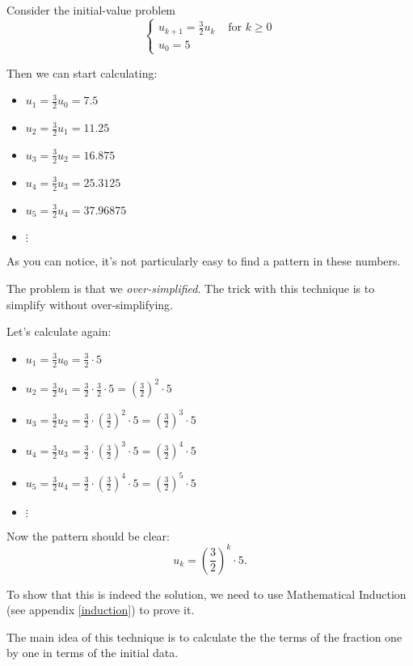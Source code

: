 \begin{example}
Consider the initial-value problem
$$
\begin{cases}
u_{k+1} = \frac32 u_k & \text{ for } k \geq 0 \\
u_0 = 5	
\end{cases}
$$

Then we can start calculating:
\begin{itemize}
	\item $u_1 = \frac32 u_0 = 7.5$
	\item $u_2 = \frac32 u_1 = 11.25$
	\item $u_3 = \frac32 u_2 = 16.875$
	\item $u_4 = \frac32 u_3 = 25.3125$
	\item $u_5 = \frac32 u_4 = 37.96875$
	\item $\vdots$
\end{itemize}

As you can notice, it's not particularly easy to find a pattern in these numbers. 

The problem is that we \emph{over-simplified}. The trick with this technique is to simplify without over-simplifying.

Let's calculate again:
\begin{itemize}
	\item $u_1 = \frac32 u_0 = \frac32 \cdot 5$
	\item $u_2 = \frac32 u_1 = \frac32 \cdot \frac32 \cdot 5 = \left(\frac32\right)^2 \cdot 5$
	\item $u_3 = \frac32 u_2 = \frac32 \cdot \left(\frac32\right)^2 \cdot 5 = \left(\frac32\right)^3 \cdot 5$
	\item $u_4 = \frac32 u_3 = \frac32 \cdot \left(\frac32\right)^3 \cdot 5 = \left(\frac32\right)^4 \cdot 5$
	\item $u_5 = \frac32 u_4 = \frac32 \cdot \left(\frac32\right)^4 \cdot 5 = \left(\frac32\right)^5 \cdot 5$
	\item $\vdots$
\end{itemize}

Now the pattern should be clear:
$$
u_k = \left(\frac32\right)^k \cdot 5.
$$

To show that this is indeed the solution, we need to use Mathematical Induction (see appendix \ref{induction}) to prove it. 
\end{example}

The main idea of this technique is to calculate the the terms of the fraction one by one in terms of the initial data.

